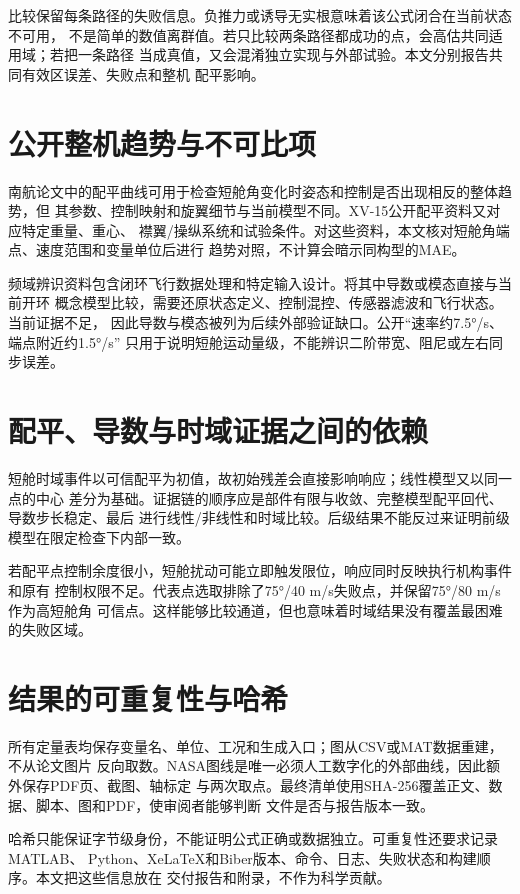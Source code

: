\documentclass[UTF8,12pt,oneside,openany,fontset=windows]{ctexbook}
\begin{document}
比较保留每条路径的失败信息。负推力或诱导无实根意味着该公式闭合在当前状态不可用， 不是简单的数值离群值。若只比较两条路径都成功的点，会高估共同适用域；若把一条路径 当成真值，又会混淆独立实现与外部试验。本文分别报告共同有效区误差、失败点和整机 配平影响。

\section{公开整机趋势与不可比项}

南航论文中的配平曲线可用于检查短舱角变化时姿态和控制是否出现相反的整体趋势，但 其参数、控制映射和旋翼细节与当前模型不同。XV-15公开配平资料又对应特定重量、重心、 襟翼/操纵系统和试验条件。对这些资料，本文核对短舱角端点、速度范围和变量单位后进行 趋势对照，不计算会暗示同构型的MAE。

频域辨识资料包含闭环飞行数据处理和特定输入设计。将其中导数或模态直接与当前开环 概念模型比较，需要还原状态定义、控制混控、传感器滤波和飞行状态。当前证据不足， 因此导数与模态被列为后续外部验证缺口。公开“速率约7.5°/s、端点附近约1.5°/s” 只用于说明短舱运动量级，不能辨识二阶带宽、阻尼或左右同步误差。

\section{配平、导数与时域证据之间的依赖}

短舱时域事件以可信配平为初值，故初始残差会直接影响响应；线性模型又以同一点的中心 差分为基础。证据链的顺序应是部件有限与收敛、完整模型配平回代、导数步长稳定、最后 进行线性/非线性和时域比较。后级结果不能反过来证明前级模型在限定检查下内部一致。

若配平点控制余度很小，短舱扰动可能立即触发限位，响应同时反映执行机构事件和原有 控制权限不足。代表点选取排除了75°/40 m/s失败点，并保留75°/80 m/s作为高短舱角 可信点。这样能够比较通道，但也意味着时域结果没有覆盖最困难的失败区域。

\section{结果的可重复性与哈希}

所有定量表均保存变量名、单位、工况和生成入口；图从CSV或MAT数据重建，不从论文图片 反向取数。NASA图线是唯一必须人工数字化的外部曲线，因此额外保存PDF页、截图、轴标定 与两次取点。最终清单使用SHA-256覆盖正文、数据、脚本、图和PDF，使审阅者能够判断 文件是否与报告版本一致。

哈希只能保证字节级身份，不能证明公式正确或数据独立。可重复性还要求记录MATLAB、 Python、XeLaTeX和Biber版本、命令、日志、失败状态和构建顺序。本文把这些信息放在 交付报告和附录，不作为科学贡献。
\end{document}
